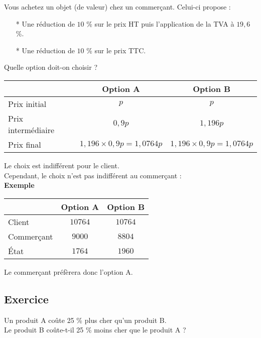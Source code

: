 Vous achetez un objet (de valeur) chez un commerçant. Celui-ci propose :

\begin{enumerate}
\item[*] Une réduction de $10$ \% sur le prix HT puis l'application de la TVA à $19,6$ \%.
\item[*] Une réduction de $10$ \% sur le prix TTC.
\end{enumerate}

Quelle option doit-on choisir ? \\

\begin{tabular}{l|c|c}
& Option A & Option B \\
\hline
Prix initial & $p$ & $p$ \\
Prix intermédiaire & $0,9p$ & $1,196p$ \\
Prix final & $1,196 \times 0,9p = 1,0764p $ & $1,196 \times 0,9p = 1,0764p $ \\
\end{tabular} 

\vspace*{.3cm}

Le choix est indifférent pour le client. \\

Cependant, le choix n'est pas indifférent au commerçant : \\

\textbf{Exemple}

\begin{tabular}{l|c|c}
& Option A & Option B \\
\hline
Client & $10764$ & $10764$ \\
Commerçant & $9000$ & $8804$ \\
État & $1764$ & $1960$ \\
\end{tabular} 

\vspace*{.3cm}

Le commerçant préfèrera donc l'option A.

\newpage

\subsection{Exercice }

Un produit A coûte 25 \% plus cher qu'un produit B. \\

Le produit B coûte-t-il 25 \% moins cher que le produit A ? \\

